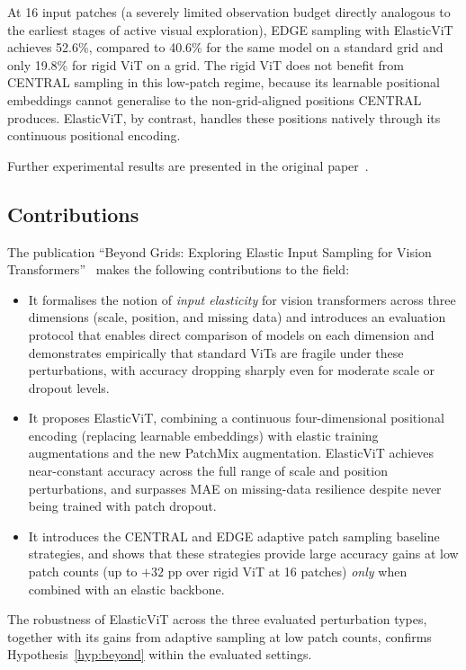 At 16 input patches (a severely limited observation budget directly analogous to the earliest stages of active visual exploration), EDGE sampling with ElasticViT achieves 52.6\%, compared to 40.6\% for the same model on a standard grid and only 19.8\% for rigid ViT on a grid. The rigid ViT does not benefit from CENTRAL sampling in this low-patch regime, because its learnable positional embeddings cannot generalise to the non-grid-aligned positions CENTRAL produces. ElasticViT, by contrast, handles these positions natively through its continuous positional encoding.

Further experimental results are presented in the original paper~.

\subsection{Contributions}
\label{sec:contributions-beyond}

The publication ``Beyond Grids: Exploring Elastic Input Sampling for Vision Transformers''~ makes the following contributions to the field:

\begin{itemize}
    \item It formalises the notion of \emph{input elasticity} for vision transformers across three dimensions (scale, position, and missing data) and introduces an evaluation protocol that enables direct comparison of models on each dimension and demonstrates empirically that standard ViTs are fragile under these perturbations, with accuracy dropping sharply even for moderate scale or dropout levels.
    \item It proposes ElasticViT, combining a continuous four-dimensional positional encoding (replacing learnable embeddings) with elastic training augmentations and the new PatchMix augmentation. ElasticViT achieves near-constant accuracy across the full range of scale and position perturbations, and surpasses MAE on missing-data resilience despite never being trained with patch dropout.
    \item It introduces the CENTRAL and EDGE adaptive patch sampling baseline strategies, and shows that these strategies provide large accuracy gains at low patch counts (up to $+32$ pp over rigid ViT at 16 patches) \emph{only} when combined with an elastic backbone.
\end{itemize}

The robustness of ElasticViT across the three evaluated perturbation types, together with its gains from adaptive sampling at low patch counts, confirms Hypothesis~\ref{hyp:beyond} within the evaluated settings.


